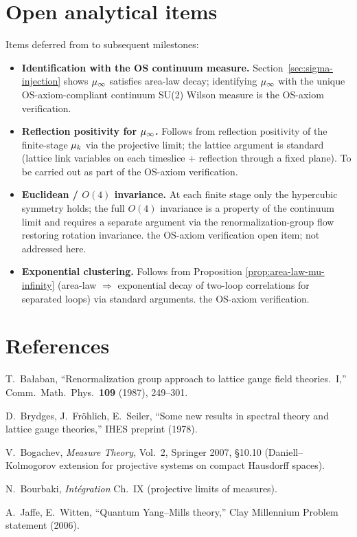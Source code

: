 \section{Open analytical items}
\label{sec:open}

Items deferred from  to subsequent milestones:

\begin{itemize}
  \item \textbf{Identification with the OS continuum measure.}
    Section~\ref{sec:sigma-injection} shows $\mu_\infty$ satisfies area-law
    decay; identifying $\mu_\infty$ with the unique OS-axiom-compliant
    continuum SU(2) Wilson measure is the OS-axiom verification.
  \item \textbf{Reflection positivity for $\mu_\infty$.}  Follows from
    reflection positivity of the finite-stage $\mu_k$ via the
    projective limit; the lattice argument is standard (lattice link
    variables on each timeslice + reflection through a fixed plane).
    To be carried out as part of the OS-axiom verification.
  \item \textbf{Euclidean / $O(4)$ invariance.}  At each finite stage
    only the hypercubic symmetry holds; the full $O(4)$ invariance is
    a property of the continuum limit and requires a separate argument
    via the renormalization-group flow restoring rotation invariance.
    the OS-axiom verification open item; not addressed here.
  \item \textbf{Exponential clustering.}  Follows from Proposition
    \ref{prop:area-law-mu-infinity} (area-law $\Rightarrow$ exponential
    decay of two-loop correlations for separated loops) via standard
    arguments.  the OS-axiom verification.
\end{itemize}

\section*{References}

\noindent[Bal87] T.~Bałaban, ``Renormalization group approach to lattice
gauge field theories.~I,'' Comm.\ Math.\ Phys.\ \textbf{109} (1987),
249--301.

\noindent[BFS78] D.~Brydges, J.~Fröhlich, E.~Seiler, ``Some new
results in spectral theory and lattice gauge theories,''
IHES preprint (1978).

\noindent[Bog07] V.~Bogachev, \emph{Measure Theory}, Vol.~2, Springer
2007, \S10.10 (Daniell--Kolmogorov extension for projective systems on
compact Hausdorff spaces).

\noindent[Bou04] N.~Bourbaki, \emph{Intégration} Ch.~IX (projective
limits of measures).

\noindent[JW06] A.~Jaffe, E.~Witten, ``Quantum Yang--Mills theory,''
Clay Millennium Problem statement (2006).
